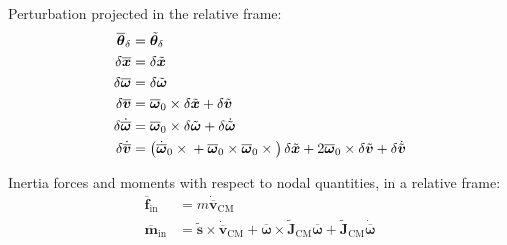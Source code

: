 \documentclass[10pt,fleqn,subeqn]{report}
\newcommand{\T}[1]{\bm{#1}}
\newcommand{\TT}[1]{\bm{#1}}
\begin{document}
Perturbation projected in the relative frame:
\begin{subequations}
\begin{align}
	\overline{\T{\theta}}_{\delta} &= \tilde{\T{\theta}}_{\delta} \\
	\delta\overline{\T{x}} &= \delta\tilde{\T{x}} \\
	\delta\overline{\T{\omega}} &= \delta\tilde{\T{\omega}} \\
	\delta\overline{\T{v}} &= \overline{\T{\omega}}_0 \times \delta\tilde{\T{x}}
		+ \delta\tilde{\T{v}} \\
	\delta\dot{\overline{\T{\omega}}} &= \overline{\T{\omega}}_0 \times \delta\tilde{\T{\omega}} 
		+ \delta\dot{\tilde{\T{\omega}}} \\
	\delta\dot{\overline{\T{v}}} &= \plbr{
			\dot{\overline{\T{\omega}}}_0 \times{}
			+ \overline{\T{\omega}}_0 \times \overline{\T{\omega}}_0 \times{}
		} \delta\tilde{\T{x}}
		+ 2 \overline{\T{\omega}}_0 \times \delta\tilde{\T{v}}
		+ \delta\dot{\tilde{\T{v}}}
\end{align}
\end{subequations}


Inertia forces and moments with respect to nodal quantities, in a relative frame:
\begin{subequations}
\begin{align}
	\overline{\T{f}}_{\text{in}}
	&= m \dot{\overline{\T{v}}}_{\text{CM}}
	\\
%
	\overline{\T{m}}_{\text{in}}
	&= \tilde{\T{s}}\times \dot{\overline{\T{v}}}_{\text{CM}}
	+ \overline{\T{\omega}} \times \tilde{\TT{J}}_{\text{CM}} \overline{\T{\omega}}
	+ \tilde{\TT{J}}_{\text{CM}} \dot{\overline{\T{\omega}}}
\end{align}
\end{subequations}
\end{document}
